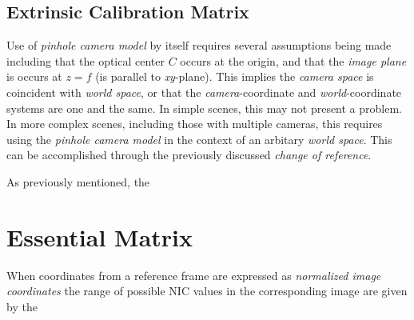 \subsection{Extrinsic Calibration Matrix}
\par Use of \textit{pinhole camera model} by itself requires several assumptions being made including that the optical center $C$ occurs at the origin, and that the \textit{image plane} is occurs at $z=f$ (is parallel to \textit{xy}-plane). This implies the \textit{camera space} is coincident with \textit{world space}, or that the \textit{camera}-coordinate and \textit{world}-coordinate systems are one and the same. In simple scenes, this may not present a problem. In more complex scenes, including those with multiple cameras, this requires using the \textit{pinhole camera model} in the context of an arbitary \textit{world space}. This can be accomplished through the previously discussed \textit{change of reference}.\newline
  
\par As previously mentioned, the
\section{Essential Matrix}

\par When coordinates from a reference frame are expressed as \textit{normalized image coordinates} the range of possible NIC values in the corresponding image are given by the 

